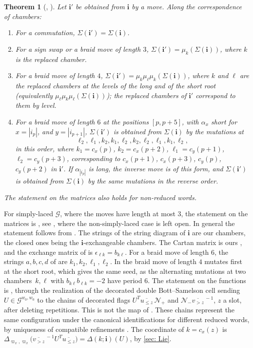 \documentclass[a4paper]{amsart}
\numberwithin{equation}{section}
\newtheorem{theorem}{Theorem}[section]
\theoremstyle{definition}
\theoremstyle{remark}
\newcommand{\mcG}{\mathcal{G}}
\newcommand{\mcN}{\mathcal{N}}
\newcommand{\bfi}{\mathbf{i}}
\begin{document}
\begin{theorem}[{\cite[Theorem~3.5]{SSVZ00}, \cite[Propositions~3.7 and~3.25]{SW21}}]
  \label{thm: SSVZ}
  Let $\bfi'$ be obtained from $\bfi$ by a move.
  Along the correspondence of chambers:
  \begin{enumerate}
    \item For a commutation, $\Sigma(\bfi')=\Sigma(\bfi)$.
    \item For a sign swap or a braid move of length $3$, $\Sigma(\bfi')=\mu_k(\Sigma(\bfi))$, where $k$ is the replaced chamber.
    \item For a braid move of length $4$, $\Sigma(\bfi')=\mu_k\mu_\ell\mu_k(\Sigma(\bfi))$, where $k$ and $\ell$ are the replaced chambers at the levels of the long and of the short root (equivalently $\mu_\ell\mu_k\mu_\ell(\Sigma(\bfi))$); the replaced chambers of $\bfi'$ correspond to them by level.
    \item For a braid move of length $6$ at the positions $[p,p+5]$, with $\alpha_x$ short for $x=|i_p|$, and $y=|i_{p+1}|$, $\Sigma(\bfi')$ is obtained from $\Sigma(\bfi)$ by the mutations at
      \[
        \ell_2,\ell_1,k_2,k_1,\ell_2,k_2,\ell_2,\ell_1,k_1,\ell_2,
      \]
      in this order, where $k_1=c_x(p)$, $k_2=c_x(p+2)$, $\ell_1=c_y(p+1)$, $\ell_2=c_y(p+3)$, corresponding to $c_x(p+1)$, $c_x(p+3)$, $c_y(p)$, $c_y(p+2)$ in $\bfi'$.
      If $\alpha_{|i_p|}$ is long, the inverse move is of this form, and $\Sigma(\bfi')$ is obtained from $\Sigma(\bfi)$ by the same mutations in the reverse order.
  \end{enumerate}
  The statement on the matrices also holds for non-reduced words.
\end{theorem}
For simply-laced $\mcG$, where the moves have length at most $3$, the statement on the matrices is \cite[Theorem~3.5]{SSVZ00}, see \cite[Remark~2.14]{BFZ05}, where the non-simply-laced case is left open.
In general the statement follows from \cite[Proposition~3.7]{SW21}.
The strings of the string diagram of $\bfi$ are our chambers, the closed ones being the $\bfi$-exchangeable chambers.
The Cartan matrix is ours \cite[Appendix~A.1]{SW21}, and the exchange matrix of \cite[Section~3.1]{SW21} is $\epsilon_{\ell k}=b_{k\ell}$.
For a braid move of length $6$, the strings $a,b,c,d$ of \cite[Proposition~3.7(2)]{SW21} are $k_1,k_2,\ell_1,\ell_2$.
In \cite[Proposition~3.7]{SW21} the braid move of length $4$ mutates first at the short root, which gives the same seed, as the alternating mutations at two chambers~$k,\ell$ with $b_{k\ell}b_{\ell k}=-2$ have period $6$.
The statement on the functions is \cite[Proposition~3.25]{SW21}, through the realization of the decorated double Bott--Samelson cell \cite[Section~3.3]{SW21} sending $U\in\mcG^{w_0,w_0}$ to the chains of decorated flags $U^T\overline{u_{\le z}}\,\mcN_+$ and $\mcN_-\overline{v_{>z}}^{\,-1}$, $z$ a slot, after deleting repetitions.
This is not the map of \cite[Section~1.4]{SW21}.
These chains represent the same configuration under the canonical identifications for different reduced words, by uniqueness of compatible refinements \cite[Lemmas~2.10--2.11]{SW21}.
The coordinate \cite[Definition~3.20]{SW21} of $k=c_x(z)$ is $\Delta_{\varpi_x,\varpi_x}\big(\overline{v_{>z}}^{\,-1}U^T\overline{u_{\le z}}\big)=\Delta(k;\bfi)(U)$, by \cref{sec: Lie}.
\end{document}
